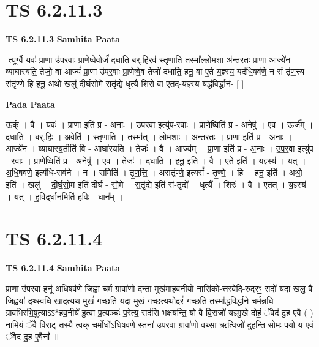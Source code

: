 \documentclass[17pt]{extarticle}
\begin{document}
\section*{ TS 6.2.11.3 }

\textbf{TS 6.2.11.3 } \newline
\textbf{Samhita Paata} \newline

-त्यूर्ग्वै यवः॑ प्रा॒णा उ॑पर॒वाः प्रा॒णेष्वे॒वोर्जं॑ दधाति ब॒र्॒.हिरव॑ स्तृणाति॒ तस्मा᳚ल्लोम॒शा अ॑न्तर॒तः प्रा॒णा आज्ये॑न॒ व्याघा॑रयति॒ तेजो॒ वा आज्यं॑ प्रा॒णा उ॑पर॒वाः प्रा॒णेष्वे॒व तेजो॑ दधाति॒ हनू॒ वा ए॒ते य॒ज्ञ्स्य॒ यद॑धि॒षव॑णे॒ न सं तृ॑ण॒त्त्य स॑तृंण्णे॒ हि हनू॒ अथो॒ खलु॑ दीर्घसो॒मे स॒तृंद्ये॒ धृत्यै॒ शिरो॒ वा ए॒तद्-य॒ज्ञ्स्य॒ यद्ध॑वि॒र्द्धानं॑- [  ] \newline

\textbf{Pada Paata} \newline

ऊर्क् । वै । यवः॑ । प्रा॒णा इति॑ प्र - अ॒नाः । उ॒प॒र॒वा इत्यु॑प-र॒वाः । प्रा॒णेष्विति॑ प्र - अ॒नेषु॑ । ए॒व । ऊर्ज᳚म् । द॒धा॒ति॒ । ब॒र्॒.हिः । अवेति॑ । स्तृ॒णा॒ति॒ । तस्मा᳚त् । लो॒म॒शाः । अ॒न्त॒र॒तः । प्रा॒णा इति॑ प्र - अ॒नाः । आज्ये॑न । व्याघा॑रय॒तीति॑ वि - आघा॑रयति । तेजः॑ । वै । आज्य᳚म् । प्रा॒णा इति॑ प्र - अ॒नाः । उ॒प॒र॒वा इत्यु॑प - र॒वाः । प्रा॒णेष्विति॑ प्र - अ॒नेषु॑ । ए॒व । तेजः॑ । द॒धा॒ति॒ । हनू॒ इति॑ । वै । ए॒ते इति॑ । य॒ज्ञ्स्य॑ । यत् । अ॒धि॒षव॑णे॒ इत्य॑धि-सव॑ने । न । समिति॑ । तृ॒ण॒त्ति॒ । अस॑तृंण्णे॒ इत्यसं᳚ - तृ॒ण्णे॒ । हि । हनू॒ इति॑ । अथो॒ इति॑ । खलु॑ । दी॒र्घ॒सो॒म इति॑ दीर्घ - सो॒मे । स॒तृंद्ये॒ इति॑ सं-तृद्ये᳚ । धृत्यै᳚ । शिरः॑ । वै । ए॒तत् । य॒ज्ञ्स्य॑ । यत् । ह॒वि॒द्‌र्धान॒मिति॑ हविः - धान᳚म् ।  \newline




\section*{ TS 6.2.11.4 }

\textbf{TS 6.2.11.4 } \newline
\textbf{Samhita Paata} \newline

प्रा॒णा उ॑पर॒वा हनू॑ अधि॒षव॑णे जि॒ह्वा चर्म॒ ग्रावा॑णो॒ दन्ता॒ मुख॑माहव॒नीयो॒ नासि॑को-त्तरवे॒दि-रु॒दरꣳ॒॒ सदो॑ य॒दा खलु॒ वै जि॒ह्वया॑ द॒थ्स्वधि॒ खाद॒त्यथ॒ मुखं॑ गच्छति य॒दा मुखं॒ गच्छ॒त्यथो॒दरं॑ गच्छति॒ तस्मा᳚द्धवि॒र्द्धाने॒ चर्म॒न्नधि॒ ग्राव॑भिरभि॒षुत्या॑ऽऽ*हव॒नीये॑ हु॒त्वा प्र॒त्यञ्चः॑ प॒रेत्य॒ सद॑सि भक्षयन्ति॒ यो वै वि॒राजो॑ यज्ञ्मु॒खे दोहं॒ ॅवेद॑ दु॒ह ए॒वै ( ) ना॑मि॒यं ॅवै वि॒राट् तस्यै॒ त्वक् चर्मोधो॑ऽधि॒षव॑णे॒ स्तना॑ उपर॒वा ग्रावा॑णो व॒थ्सा ऋ॒त्विजो॑ दुहन्ति॒ सोमः॒ पयो॒ य ए॒वं ॅवेद॑ दु॒ह ए॒वैनां᳚ ॥ \newline
\end{document}
